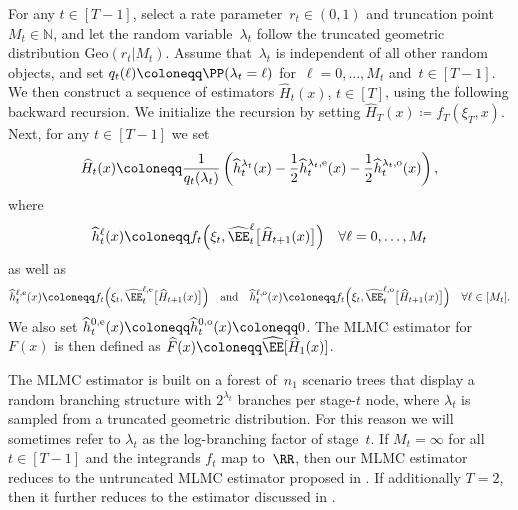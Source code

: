 \documentclass[11pt]{article}
\let\hat\widehat
\begin{document}
\begin{defn}
\label{def:MCCO_RTMLMC}
For any $t\in[T-1]$, select a rate parameter~$r_t \in(0,1)$ and truncation point $M_t\in\mathbb N$, and let the random variable~$\lambda_t$ follow the truncated geometric distribution $\mathrm{Geo}(r_t | M_t)$. Assume that~$\lambda_t$ is independent of all other random objects, and set $q_t(\ell)\coloneqq\PP(\lambda_t=\ell)$ for~$\ell=0,\ldots,M_t$ and~$t\in[T-1]$. We then construct a sequence of estimators $\hat H_t(x)$, $t\in[T]$, using the following backward recursion. We initialize the recursion by setting $\hat H_T(x)\coloneqq f_T(\xi_T,x)$. Next, for any $t\in[T-1]$ we set
\begin{align}
    \hat{H}_t(x)\coloneqq \frac{1}{q_{t}(\lambda_{t})}\left( \hat{h}_t^{\lambda_t}(x)-\frac{1}{2}\hat{h}_t^{\lambda_t, {\rm e}}(x)-\frac{1}{2}\hat{h}_t^{\lambda_t,{\rm o}}(x)\right),
    \label{eq:H_hat}
\end{align}
where
\begin{align*}
    \hat{h}_t^{\ell}(x)\coloneqq f_t \Big(\xi_t,\hat \EE_t^{\ell} \big[ \hat{H}_{t+1}(x) \big] \Big) \quad \forall \ell=0,\ldots, M_t
\end{align*}
as well as
\begin{align*}
    \hat{h}_t^{\ell,{\rm e}}(x) \coloneqq f_t \Big(\xi_t, \hat \EE_t^{\ell,\rm e} \big[ \hat H_{t+1}(x) \big] \Big) \quad \text{and} \quad \hat{h}_t^{\ell,{\rm o}}(x) \coloneqq f_t \Big(\xi_t, \hat \EE_t^{\ell,\rm o} \big[ \hat{H}_{t+1}(x) \big] \Big) \quad \forall \ell\in [M_t].
\end{align*}
We also set $\hat{h}_t^{0,{\rm e}}(x)\coloneqq\hat{h}_t^{0,{\rm o}}(x)\coloneqq 0$. The MLMC estimator for $F(x)$ is then defined as $\hat{F}(x)\coloneqq \hat\EE [\hat{H}_{1}(x)]$. 
\end{defn}

The MLMC estimator is built on a forest of~$n_1$ scenario trees that display a random branching structure with $2^{\lambda_t}$ branches per stage-$t$ node, where $\lambda_t$ is sampled from a truncated geometric distribution. For this reason we will sometimes refer to $\lambda_t$ as the log-branching factor of stage~$t$. If $M_t=\infty$ for all $t\in[T-1]$ and the integrands $f_t$ map to~$\RR$, then our MLMC estimator reduces to the untruncated MLMC estimator proposed in \cite{syed2023optimal}. If additionally $T=2$, then it further reduces to the estimator discussed in \cite[\S~3.2]{wang2023unbiased}.
\end{document}
